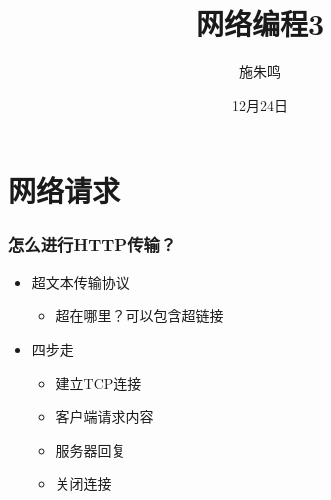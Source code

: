 \documentclass[12pt,AutoFakeBold,aspectratio=43,mathserif]{beamer}
\title{网络编程3}
\author{施朱鸣}
\date{12月24日}
\begin{document}
    {
    
    \begin{frame}
    \titlepage
    \end{frame}

    \section{网络请求}
    \begin{frame}
        \frametitle{怎么进行HTTP传输？}
    
        \begin{itemize}
            \item 超文本传输协议\begin{itemize}
                \item 超在哪里？可以包含超链接
            \end{itemize}
            \item 四步走\begin{itemize}
                \item 建立TCP连接
                \item 客户端请求内容
                \item 服务器回复
                \item 关闭连接
            \end{itemize}
        \end{itemize}


\end{frame}}
\end{document}
